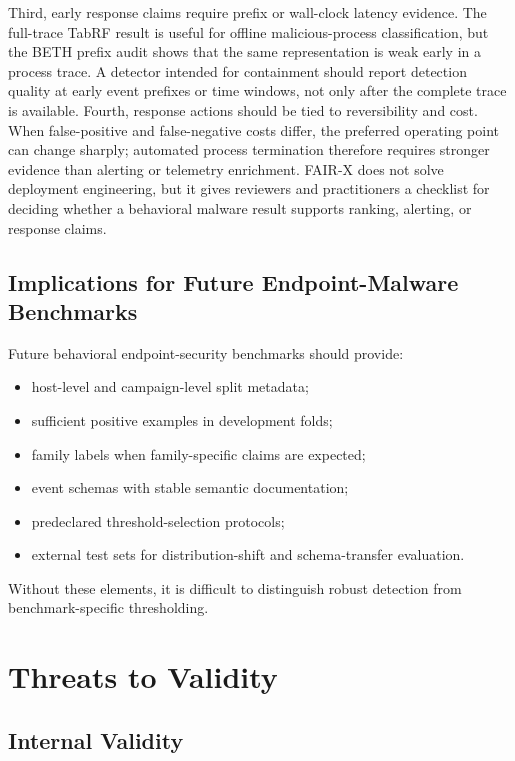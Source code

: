 \documentclass[10pt,journal,compsoc]{IEEEtran}
\begin{document}
Third, early response claims require prefix or wall-clock latency evidence. The full-trace TabRF result is useful for offline malicious-process classification, but the BETH prefix audit shows that the same representation is weak early in a process trace. A detector intended for containment should report detection quality at early event prefixes or time windows, not only after the complete trace is available. Fourth, response actions should be tied to reversibility and cost. When false-positive and false-negative costs differ, the preferred operating point can change sharply; automated process termination therefore requires stronger evidence than alerting or telemetry enrichment. FAIR-X does not solve deployment engineering, but it gives reviewers and practitioners a checklist for deciding whether a behavioral malware result supports ranking, alerting, or response claims.

\subsection{Implications for Future Endpoint-Malware Benchmarks}

Future behavioral endpoint-security benchmarks should provide:
\begin{itemize}
    \item host-level and campaign-level split metadata;
    \item sufficient positive examples in development folds;
    \item family labels when family-specific claims are expected;
    \item event schemas with stable semantic documentation;
    \item predeclared threshold-selection protocols;
    \item external test sets for distribution-shift and schema-transfer evaluation.
\end{itemize}
Without these elements, it is difficult to distinguish robust detection from benchmark-specific thresholding.

\section{Threats to Validity}
\label{sec:validity}

\subsection{Internal Validity}
\end{document}
